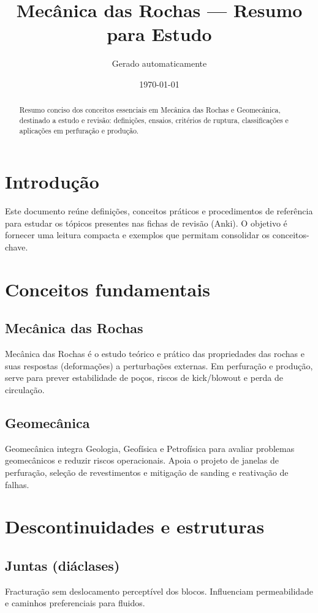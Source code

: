 \documentclass[12pt,a4paper]{article}
\title{Mecânica das Rochas — Resumo para Estudo}
\author{Gerado automaticamente}
\date{\today}
\begin{document}
\maketitle
\begin{abstract}
Resumo conciso dos conceitos essenciais em Mecânica das Rochas e Geomecânica, destinado a estudo e revisão: definições, ensaios, critérios de ruptura, classificações e aplicações em perfuração e produção.
\end{abstract}
\tableofcontents
\newpage

\section{Introdução}
Este documento reúne definições, conceitos práticos e procedimentos de referência para estudar os tópicos presentes nas fichas de revisão (Anki). O objetivo é fornecer uma leitura compacta e exemplos que permitam consolidar os conceitos-chave.

\section{Conceitos fundamentais}
\subsection{Mecânica das Rochas}
Mecânica das Rochas é o estudo teórico e prático das propriedades das rochas e suas respostas (deformações) a perturbações externas. Em perfuração e produção, serve para prever estabilidade de poços, riscos de kick/blowout e perda de circulação.

\subsection{Geomecânica}
Geomecânica integra Geologia, Geofísica e Petrofísica para avaliar problemas geomecânicos e reduzir riscos operacionais. Apoia o projeto de janelas de perfuração, seleção de revestimentos e mitigação de sanding e reativação de falhas.

\section{Descontinuidades e estruturas}
\subsection{Juntas (diáclases)}
Fracturação sem deslocamento perceptível dos blocos. Influenciam permeabilidade e caminhos preferenciais para fluidos.
\end{document}
